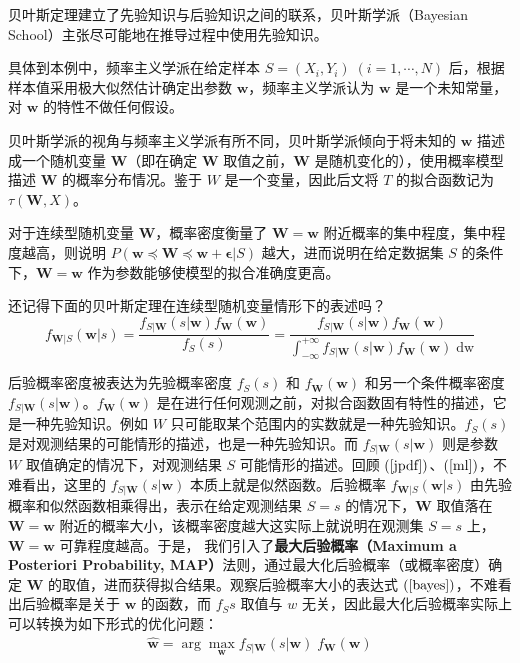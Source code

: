 \documentclass[UTF8, a4paper, oneside]{article}
\begin{document}
贝叶斯定理建立了先验知识与后验知识之间的联系，贝叶斯学派（Bayesian School）主张尽可能地在推导过程中使用先验知识。

具体到本例中，频率主义学派在给定样本 $S = {(X_i, Y_i)} \; (i = 1, \cdots, N)$ 后，根据样本值采用极大似然估计确定出参数 $\boldsymbol{w}$，频率主义学派认为 $\boldsymbol{w}$ 是一个未知常量，对 $\boldsymbol{w}$ 的特性不做任何假设。

贝叶斯学派的视角与频率主义学派有所不同，贝叶斯学派倾向于将未知的 $\boldsymbol{w}$ 描述成一个随机变量 $\boldsymbol{W}$（即在确定 $\boldsymbol{W}$ 取值之前，$\boldsymbol{W}$ 是随机变化的），使用概率模型描述 $\boldsymbol{W}$ 的概率分布情况。鉴于 $W$ 是一个变量，因此后文将 $T$ 的拟合函数记为 $\tau(\boldsymbol{W},X)$。

对于连续型随机变量 $\boldsymbol{W}$，概率密度衡量了 $\boldsymbol{W} = \boldsymbol{w}$ 附近概率的集中程度，集中程度越高，则说明 $P(\boldsymbol{w} \preceq \boldsymbol{W} \preceq \boldsymbol{w}+\boldsymbol{\epsilon} | S)$ 越大，进而说明在给定数据集 $S$ 的条件下，$\boldsymbol{W} = \boldsymbol{w}$ 作为参数能够使模型的拟合准确度更高。

还记得下面的贝叶斯定理在连续型随机变量情形下的表述吗？
\begin{equation} \label{bayes}
f_{\boldsymbol{W}|S}(\boldsymbol{w}|s)
=\frac{f_{S|\boldsymbol{W}}(s|\boldsymbol{w}) f_{\boldsymbol{W}}(\boldsymbol{w})}{f_S(s)}
=\frac{f_{S|\boldsymbol{W}}(s|\boldsymbol{w}) f_{\boldsymbol{W}}(\boldsymbol{w})}{\int_{-\infty}^{+\infty} f_{S|\boldsymbol{W}}(s|\boldsymbol{w}) f_{\boldsymbol{W}}(\boldsymbol{w})\;\mathrm{d}\mathrm{w}}
\end{equation}

后验概率密度被表达为先验概率密度 $f_S(s)$ 和 $f_{\boldsymbol{W}}(\boldsymbol{w})$ 和另一个条件概率密度 $f_{S|\boldsymbol{W}}(s|\boldsymbol{w})$。$f_{\boldsymbol{W}}(\boldsymbol{w})$ 是在进行任何观测之前，对拟合函数固有特性的描述，它是一种先验知识。例如 $W$ 只可能取某个范围内的实数就是一种先验知识。$f_S(s)$ 是对观测结果的可能情形的描述，也是一种先验知识。而 $f_{S|\boldsymbol{W}}(s|\boldsymbol{w})$ 则是参数 $W$ 取值确定的情况下，对观测结果 $S$ 可能情形的描述。回顾 $(\ref{jpdf})$、$(\ref{ml})$，不难看出，这里的 $f_{S|\boldsymbol{W}}(s|\boldsymbol{w})$ 本质上就是似然函数。后验概率 $f_{\boldsymbol{W}|S}(\boldsymbol{w}|s)$ 由先验概率和似然函数相乘得出，表示在给定观测结果 $S = s$ 的情况下，$\boldsymbol{W}$ 取值落在 $\boldsymbol{W} = \boldsymbol{w}$ 附近的概率大小，该概率密度越大这实际上就说明在观测集 $S = s$ 上，$\boldsymbol{W} = \boldsymbol{w}$ 可靠程度越高。于是，
我们引入了\textbf{最大后验概率（Maximum a Posteriori Probability, MAP）}法则，通过最大化后验概率（或概率密度）确定 $\boldsymbol{W}$ 的取值，进而获得拟合结果。观察后验概率大小的表达式 $(\ref{bayes})$，不难看出后验概率是关于 $\boldsymbol{w}$ 的函数，而 $f_S{s}$ 取值与 $w$ 无关，因此最大化后验概率实际上可以转换为如下形式的优化问题：
\begin{gather}
\boldsymbol{\hat{w}} = \arg \max_{\boldsymbol{w}} f_{S|\boldsymbol{W}}(s|\boldsymbol{w})\;f_{\boldsymbol{W}}(\boldsymbol{w})
\end{gather}
\end{document}
